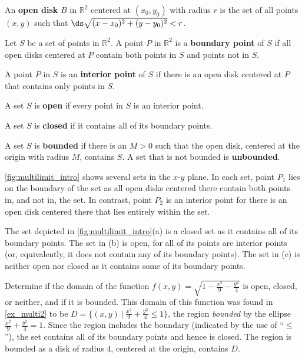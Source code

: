 \begin{definition}\label{def:open}%
An \textbf{open disk} $B$ in $\mathbb{R}^2$ centered at $(x_0,y_0)$ with radius $r$ is the set of all points $(x,y)$ such that $\ds\sqrt{(x-x_0)^2+(y-y_0)^2} < r$. \bigskip

Let $S$ be a set of points in $\mathbb{R}^2$. A point $P$ in $\mathbb{R}^2$ is a \textbf{boundary point} of $S$  if all open disks centered at $P$ contain both points in $S$ and points not in $S$.\bigskip

A point $P$ in $S$ is an \textbf{interior point} of $S$ if there is an open disk centered at $P$ that contains only points in $S$.\bigskip

A set $S$ is \textbf{open} if every point in $S$ is an interior point.\bigskip

A set $S$ is \textbf{closed} if it contains all of its boundary points.\bigskip

A set $S$ is \textbf{bounded} if there is an $M>0$ such that the open disk, centered at the origin with radius $M$, contains $S$. A set that is not bounded is \textbf{unbounded}.
\end{definition}

\autoref{fig:multilimit_intro} shows several sets in the $x$-$y$ plane. In each set, point $P_1$ lies on the boundary of the set as all open disks centered there contain both points in, and not in, the set. In contrast, point $P_2$ is an interior point for there is an open disk centered there that lies entirely within the set.

The set depicted in \autoref{fig:multilimit_intro}(a) is a closed set as it contains all of its boundary points. The set in (b) is open, for all of its points are interior points (or, equivalently, it does not contain any of its boundary points). The set in (c) is neither open nor closed as it contains  some of its boundary points.

\begin{example}\label{ex_multilimit1}%
Determine if the domain of the function $f(x,y)=\sqrt{1-\frac{x^2}9-\frac{y^2}4}$ is open, closed, or neither, and if it is bounded.
\solution
This domain of this function was found in \autoref{ex_multi2} to be $D = \{(x,y)\ |\ \frac{x^2}9+\frac{y^2}4\leq 1\}$, the region \emph{bounded} by the ellipse $\frac{x^2}9+\frac{y^2}4=1$. Since the region includes the boundary (indicated by the use of ``$\leq$''), the set contains all of its boundary points and hence is closed. The region is bounded as a disk of radius 4, centered at the origin, contains $D$.
\end{example}

